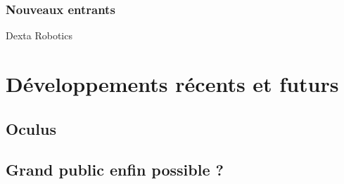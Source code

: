 \documentclass[a4,12pt]{scrartcl}
\begin{document}
\subsubsection{Nouveaux entrants}

Dexta Robotics




\section{Développements récents et futurs}

\subsection{Oculus}

\subsection{Grand public enfin possible ?}



\newpage


\end{document}
